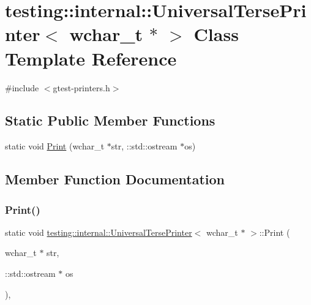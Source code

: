 \hypertarget{classtesting_1_1internal_1_1_universal_terse_printer_3_01wchar__t_01_5_01_4}{}\section{testing\+::internal\+::Universal\+Terse\+Printer$<$ wchar\+\_\+t $\ast$ $>$ Class Template Reference}
\label{classtesting_1_1internal_1_1_universal_terse_printer_3_01wchar__t_01_5_01_4}


{\ttfamily \#include $<$gtest-\/printers.\+h$>$}

\subsection*{Static Public Member Functions}
\begin{DoxyCompactItemize}
\item 
static void \mbox{\hyperlink{classtesting_1_1internal_1_1_universal_terse_printer_3_01wchar__t_01_5_01_4_a9cdf673b44d19e6879253f30f11cd740}{Print}} (wchar\+\_\+t $\ast$str, \+::std\+::ostream $\ast$os)
\end{DoxyCompactItemize}


\subsection{Member Function Documentation}
\mbox{\label{classtesting_1_1internal_1_1_universal_terse_printer_3_01wchar__t_01_5_01_4_a9cdf673b44d19e6879253f30f11cd740}} 
\subsubsection{\texorpdfstring{Print()}{Print()}}
{\footnotesize\ttfamily static void \mbox{\hyperlink{classtesting_1_1internal_1_1_universal_terse_printer}{testing\+::internal\+::\+Universal\+Terse\+Printer}}$<$ wchar\+\_\+t $\ast$ $>$\+::Print (\begin{DoxyParamCaption}\item[{wchar\+\_\+t $\ast$}]{str,  }\item[{\+::std\+::ostream $\ast$}]{os }\end{DoxyParamCaption})\hspace{0.3cm}{\ttfamily [inline]}, {\ttfamily [static]}}



